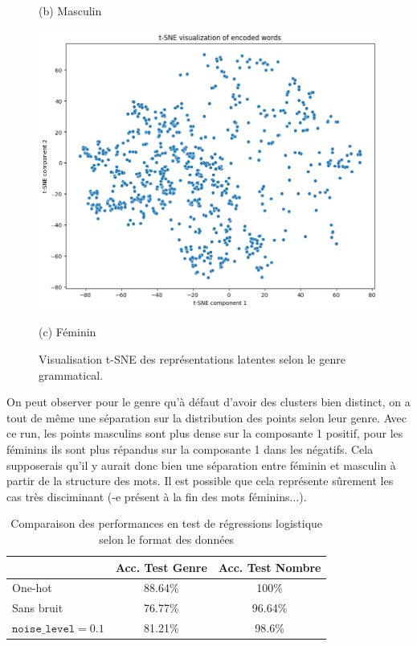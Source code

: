 \documentclass{article}
\begin{document}
\begin{figure}[H]
\begin{minipage}[b]{0.32\textwidth}
        \caption*{(b) Masculin}
        \label{fig:m}
    \end{minipage}
    \hfill
    \begin{minipage}[b]{0.32\textwidth}
        \centering
        \includegraphics[width=\textwidth]{Images/tsne_f.png}
        \caption*{(c) Féminin}
        \label{fig:f}
    \end{minipage}
    \caption{Visualisation t-SNE des représentations latentes selon le genre grammatical.}
    \label{fig:tsne_genre}
\end{figure}

On peut observer pour le genre qu'à défaut d'avoir des clusters bien distinct, on a tout de même une séparation sur la distribution des points selon leur genre. Avec ce run, les points masculins sont plus dense sur la composante 1 positif, pour les féminins ils sont plus répandus sur la composante 1 dans les négatifs. Cela supposerais qu'il y aurait donc bien une séparation entre féminin et masculin à partir de la structure des mots. Il est possible que cela représente sûrement les cas très disciminant (-e présent à la fin des mots féminins...).

\begin{table}[H]
\centering
\begin{tabular}{lcc}
\hline
 & \textbf{Acc. Test Genre} & \textbf{Acc. Test Nombre} \\
\hline
One-hot & 88.64\% & 100\% \\
Sans bruit & 76.77\% & 96.64\% \\
$\texttt{noise\_level} = 0.1$ & 81.21\% & 98.6\% \\
\hline
\end{tabular}
\caption{Comparaison des performances en test de régressions logistique selon le format des données}
\end{table}
\end{document}
